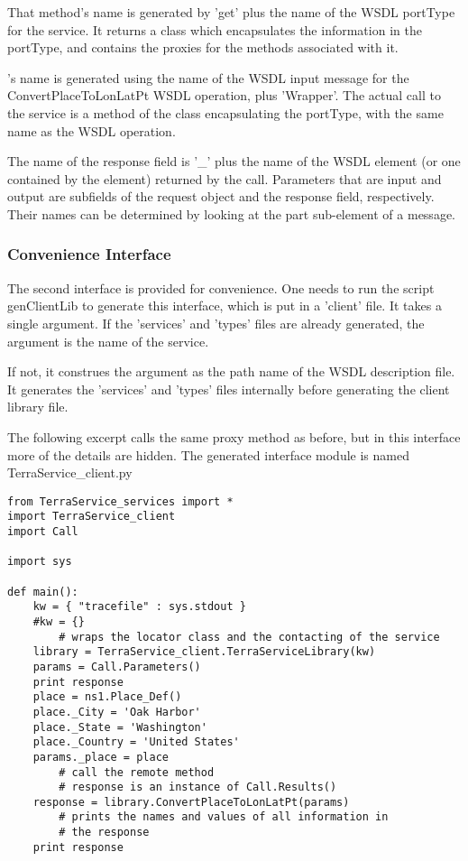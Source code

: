 That method's name is generated by 'get' plus the name of the WSDL portType
for the service.  It returns a class which
encapsulates the information in the portType, and contains the proxies
for the methods associated with it.

's
name is generated using
the name of the WSDL input message for the ConvertPlaceToLonLatPt
WSDL operation, plus 'Wrapper'.  The actual call to the service is a method of
the class encapsulating the portType, with the same name as the WSDL operation.

The name of the response field is '_' plus the name of the
WSDL element (or one contained by the element) returned by the call.
Parameters that are input and output are subfields of
the request object and the response field, respectively. 
Their names can be determined by looking at the part sub-element of a
message.

\subsubsection{Convenience Interface}

The second interface is provided for convenience.
One needs to run the script genClientLib to
generate this interface, which is put in a 'client' file.
It takes a single argument.  If the 'services' and 'types' files are
already generated, the argument is the name of the service.

If not, it construes the argument as the path name of the WSDL
description file.  It generates the 'services' and 'types' files
internally before generating the client library file.

The following excerpt calls the same
proxy method as before, but in this interface more of the details are
hidden.  The generated interface module is named TerraService_client.py

\begin{verbatim}
from TerraService_services import *
import TerraService_client
import Call

import sys

def main():
    kw = { "tracefile" : sys.stdout }
    #kw = {}
        # wraps the locator class and the contacting of the service
    library = TerraService_client.TerraServiceLibrary(kw)
    params = Call.Parameters()
    print response
    place = ns1.Place_Def()
    place._City = 'Oak Harbor'
    place._State = 'Washington'
    place._Country = 'United States'
    params._place = place
        # call the remote method
        # response is an instance of Call.Results()
    response = library.ConvertPlaceToLonLatPt(params)   
        # prints the names and values of all information in
        # the response
    print response

\end{verbatim}

